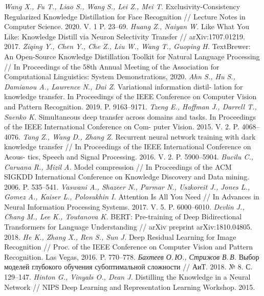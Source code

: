 \documentclass[12pt]{a&t}
\begin{document}
\begin{thebibliography}{10}
    \textit{Wang X., Fu T., Liao S., Wang S., Lei Z., Mei T.} Exclusivity-Consistency Regularized Knowledge Distillation for Face Recognition // Lecture Notes in Computer Science. 2020. V. 1 P. 23--69.
	\textit{Huang Z., Naiyan W.} Like What You Like: Knowledge Distill via Neuron Selectivity Transfer // arXiv:1707.01219. 2017.
    \textit{Ziqing Y., Chen Y., Che Z., Liu W., Wang T., Guoping H.} TextBrewer: An Open-Source Knowledge Distillation Toolkit for Natural Language Processing // In Proceedings of the 58th Annual Meeting of the Association for Computational Linguistics: System Demonstrations, 2020.
    \textit{Ahn S., Hu S., Damianou A., Lawrence N., Dai Z.} Variational information distil- lation for knowledge transfer. In Proceedings of the IEEE Conference on Computer Vision and Pattern Recognition. 2019. P. 9163--9171.
    \textit{Tzeng E., Hoffman J., Darrell T., Saenko K.} Simultaneous deep transfer across domains and tasks. In Proceedings of the IEEE International Conference on Com- puter Vision. 2015. V. 2. P. 4068--4076.
    \textit{Tang Z., Wang D., Zhang Z.} Recurrent neural network training with dark knowledge transfer // In Proceedings of the IEEE International Conference on Acous- tics, Speech and Signal Processing. 2016. V. 2. P. 5900--5904.
    \textit{Bucilu C., Caruana R., Mizil A.} Model compression // In Proceedings of the ACM SIGKDD International Conference on Knowledge Discovery and Data mining. 2006. P. 535--541.
	\textit{Vaswani A., Shazeer N., Parmar N., Uszkoreit J., Jones L., Gomez A., Kaiser L., Polosukhin I.} Attention Is All You Need // In Advances in Neural Information Processing Systems. 2017. V. 5. P. 6000--6010.
	\textit{Devlin J., Chang M., Lee K., Toutanova K.} BERT: Pre-training of Deep Bidirectional Transformers for Language Understanding // arXiv preprint arXiv:1810.04805. 2018.
	\textit{He K., Zhang X., Ren S., Sun J.} Deep Residual Learning for Image Recognition // Proc. of the IEEE Conference on Computer Vision and Pattern Recognition. Las Vegas, 2016. P. 770--778.
	\textit{Бахтеев О.\,Ю., Стрижов В.\,В.} Выбор моделей глубокого обучения субоптимальной сложности // АиТ. 2018. № 8. С. 129--147.
        \textit{Hinton G., Vinyals O., Dean J.} Distilling the Knowledge in a Neural Network // NIPS Deep Learning and Representation Learning Workshop. 2015.

\end{thebibliography}
\end{document}
